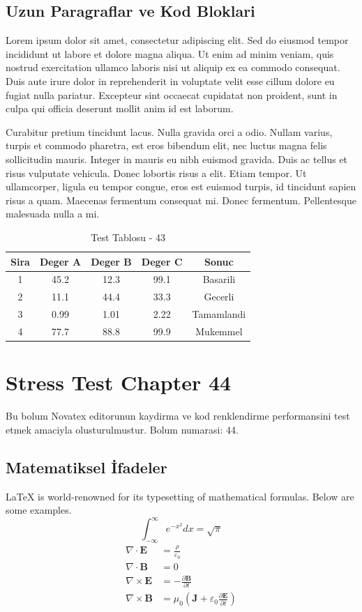 \documentclass[12pt,a4paper]{article}
\begin{document}
\subsection{Uzun Paragraflar ve Kod Bloklari}
Lorem ipsum dolor sit amet, consectetur adipiscing elit. Sed do eiusmod tempor incididunt ut labore et dolore magna aliqua. Ut enim ad minim veniam, quis nostrud exercitation ullamco laboris nisi ut aliquip ex ea commodo consequat. Duis aute irure dolor in reprehenderit in voluptate velit esse cillum dolore eu fugiat nulla pariatur. Excepteur sint occaecat cupidatat non proident, sunt in culpa qui officia deserunt mollit anim id est laborum.

Curabitur pretium tincidunt lacus. Nulla gravida orci a odio. Nullam varius, turpis et commodo pharetra, est eros bibendum elit, nec luctus magna felis sollicitudin mauris. Integer in mauris eu nibh euismod gravida. Duis ac tellus et risus vulputate vehicula. Donec lobortis risus a elit. Etiam tempor. Ut ullamcorper, ligula eu tempor congue, eros est euismod turpis, id tincidunt sapien risus a quam. Maecenas fermentum consequat mi. Donec fermentum. Pellentesque malesuada nulla a mi.

\begin{table}[h!]
\centering
\begin{tabular}{|c|c|c|c|c|}
\hline
\textbf{Sira} & \textbf{Deger A} & \textbf{Deger B} & \textbf{Deger C} & \textbf{Sonuc} \\
\hline
1 & 45.2 & 12.3 & 99.1 & Basarili \\
2 & 11.1 & 44.4 & 33.3 & Gecerli \\
3 & 0.99 & 1.01 & 2.22 & Tamamlandi \\
4 & 77.7 & 88.8 & 99.9 & Mukemmel \\
\hline
\end{tabular}
\caption{Test Tablosu - 43}
\end{table}

\newpage
\section{Stress Test Chapter 44}
Bu bolum Novatex editorunun kaydirma ve kod renklendirme performansini test etmek amaciyla olusturulmustur. Bolum numarasi: 44.

\subsection{Matematiksel İfadeler}
\LaTeX{} is world-renowned for its typesetting of mathematical formulas. Below are some examples.
\begin{equation}
\int_{-\infty}^{\infty} e^{-x^2} dx = \sqrt{\pi}
\end{equation}
\begin{align}
\nabla \cdot \mathbf{E} &= \frac{\rho}{\varepsilon_0} \\
\nabla \cdot \mathbf{B} &= 0 \\
\nabla \times \mathbf{E} &= -\frac{\partial \mathbf{B}}{\partial t} \\
\nabla \times \mathbf{B} &= \mu_0\left(\mathbf{J} + \varepsilon_0 \frac{\partial \mathbf{E}}{\partial t}\right)
\end{align}
\end{document}
